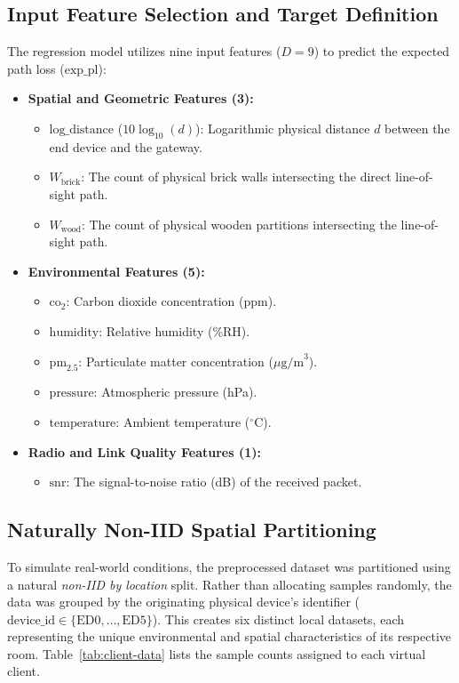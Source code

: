 \subsection{Input Feature Selection and Target Definition}
The regression model utilizes nine input features ($D=9$) to predict the expected path loss ($\text{exp\_pl}$):
\begin{itemize}
    \item \textbf{Spatial and Geometric Features (3):}
    \begin{itemize}
        \item $\text{log\_distance}$ ($10\log_{10}(d)$): Logarithmic physical distance $d$ between the end device and the gateway.
        \item $W_{\text{brick}}$: The count of physical brick walls intersecting the direct line-of-sight path.
        \item $W_{\text{wood}}$: The count of physical wooden partitions intersecting the line-of-sight path.
    \end{itemize}
    \item \textbf{Environmental Features (5):}
    \begin{itemize}
        \item $\text{co}_2$: Carbon dioxide concentration (ppm).
        \item $\text{humidity}$: Relative humidity (\%RH).
        \item $\text{pm}_{2.5}$: Particulate matter concentration ($\mu\text{g/m}^3$).
        \item $\text{pressure}$: Atmospheric pressure (hPa).
        \item $\text{temperature}$: Ambient temperature ($^{\circ}$C).
    \end{itemize}
    \item \textbf{Radio and Link Quality Features (1):}
    \begin{itemize}
        \item $\text{snr}$: The signal-to-noise ratio (dB) of the received packet.
    \end{itemize}
\end{itemize}

\subsection{Naturally Non-IID Spatial Partitioning}
To simulate real-world conditions, the preprocessed dataset was partitioned using a natural \textit{non-IID by location} split. Rather than allocating samples randomly, the data was grouped by the originating physical device's identifier ($\text{device\_id} \in \{\text{ED0}, \dots, \text{ED5}\}$). This creates six distinct local datasets, each representing the unique environmental and spatial characteristics of its respective room. Table~\ref{tab:client-data} lists the sample counts assigned to each virtual client.

